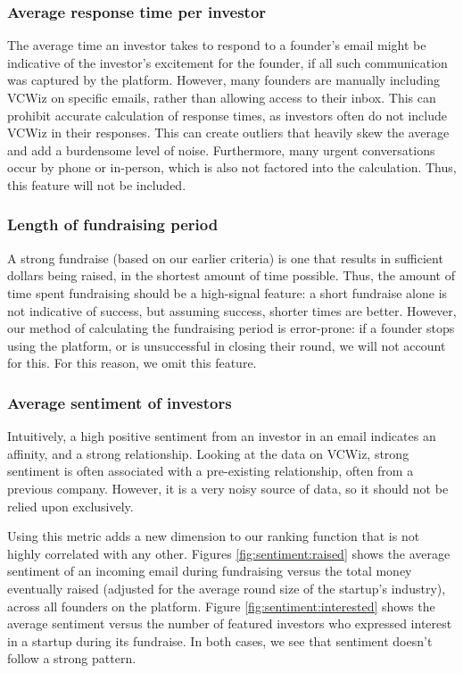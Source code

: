\subsubsection{Average response time per investor}

The average time an investor takes to respond to a founder's email might be indicative of the investor's excitement for the founder, if all such communication was captured by the platform. However, many founders are manually including VCWiz on specific emails, rather than allowing access to their inbox. This can prohibit accurate calculation of response times, as investors often do not include VCWiz in their responses. This can create outliers that heavily skew the average and add a burdensome level of noise. Furthermore, many urgent conversations occur by phone or in-person, which is also not factored into the calculation. Thus, this feature will not be included.

\subsubsection{Length of fundraising period}

A strong fundraise (based on our earlier criteria) is one that results in sufficient dollars being raised, in the shortest amount of time possible. Thus, the amount of time spent fundraising should be a high-signal feature: a short fundraise alone is not indicative of success, but assuming success, shorter times are better. However, our method of calculating the fundraising period is error-prone: if a founder stops using the platform, or is unsuccessful in closing their round, we will not account for this. For this reason, we omit this feature.

\subsubsection{Average sentiment of investors}

Intuitively, a high positive sentiment from an investor in an email indicates an affinity, and a strong relationship. Looking at the data on VCWiz, strong sentiment is often associated with a pre-existing relationship, often from a previous company. However, it is a very noisy source of data, so it should not be relied upon exclusively.

Using this metric adds a new dimension to our ranking function that is not highly correlated with any other. Figures \ref{fig:sentiment:raised} shows the average sentiment of an incoming email during fundraising versus the total money eventually raised (adjusted for the average round size of the startup's industry), across all founders on the platform. Figure \ref{fig:sentiment:interested} shows the average sentiment versus the number of featured investors who expressed interest in a startup during its fundraise. In both cases, we see that sentiment doesn't follow a strong pattern.

